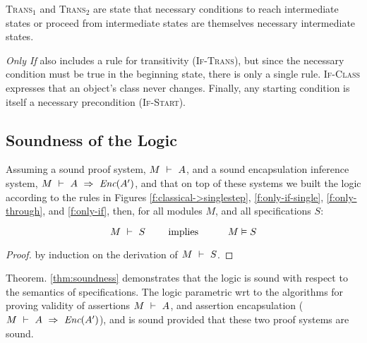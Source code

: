\textsc{Trans}$_1$ and \textsc{Trans}$_2$  {are }
 {state} that necessary conditions to reach intermediate states or 
proceed from intermediate states are themselves necessary intermediate states. 
%

\emph{Only If} also includes a rule for transitivity (\textsc{If-Trans}), but 
since the necessary condition must be true in the beginning state,
there is only a single rule. \textsc{If-Class} expresses that
an object's class never changes.
Finally, any starting condition is
itself a necessary precondition (\textsc{If-Start}). 



\subsection{Soundness of the \Nec Logic}

\label{s:soundness}

\begin{theorem}[Soundness]
\label{thm:soundness}
Assuming a sound \SpecO proof system, $M\ \vdash\ A$, and
a sound encapsulation inference system, $M\ \vdash\ A\ \Rightarrow\ \textit{Enc}(A')$,
 and  that on top of these systems we built
 the \Nec logic according to the rules in Figures \ref{f:classical->singlestep},  \ref{f:only-if-single}, 
 \ref{f:only-through},  and \ref{f:only-if},   then, for    all modules $M$, and all \Nec specifications  $S$:
 
 $$\proves{M}{S}\ \ \ \ \ \ \ \mbox{implies}\ \ \ \ \ \  \ \ \ \satisfies{M}{S}$$
\end{theorem}

\begin{proof}
by induction on the derivation of $M\ \vdash\ S$.
\end{proof}

Theorem. \ref{thm:soundness} demonstrates 
 that the   \Nec logic is sound with respect to the semantics of \Nec specifications.
 The \Nec logic parametric wrt to the algorithms for proving validity of assertions
 $M\ \vdash\ A$, and 
 assertion encapsulation ($M\ \vdash\ A\ \Rightarrow\ \textit{Enc}(A')$), and is sound
 provided that these two proof systems are sound.


